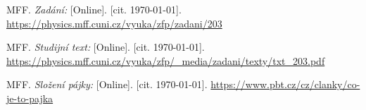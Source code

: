 
\begin{thebibliography}{9}

 MFF. \emph{Zadání:} [Online]. [cit. \today]. \newline \url{https://physics.mff.cuni.cz/vyuka/zfp/zadani/203}

 MFF. \emph{Studijní text:} [Online]. [cit. \today]. \newline \url{https://physics.mff.cuni.cz/vyuka/zfp/_media/zadani/texty/txt_203.pdf}

 MFF. \emph{Složení pájky:} [Online]. [cit. \today]. \newline \url{https://www.pbt.cz/cz/clanky/co-je-to-pajka}

\end{thebibliography}
